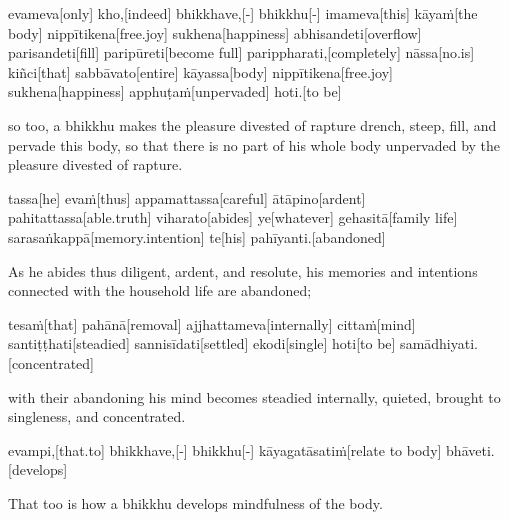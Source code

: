 \begin{samepage}
\begingl[glneveryline={\PaliGlossA,\PaliGlossB}]
evameva[only] kho,[indeed] bhikkhave,[-] bhikkhu[-] imameva[this] kāyaṁ[the body] nippītikena[free.joy] sukhena[happiness] abhisandeti[overflow] parisandeti[fill] paripūreti[become full] parippharati,[completely] nāssa[no.is] kiñci[that] sabbāvato[entire] kāyassa[body] nippītikena[free.joy] sukhena[happiness] apphuṭaṁ[unpervaded] hoti.[to be]
\endgl
\nopagebreak
\linespread{0.5}
\begin{spacin}{0.2}
{\PaliGlossFT so too, a bhikkhu makes the pleasure divested of rapture drench, steep, fill, and pervade this body, so that there is no part of his whole body unpervaded by the pleasure divested of rapture.}
\end{spacin}
\vskip 12pt
\end{samepage}
\begin{samepage}
\begingl[glneveryline={\PaliGlossA,\PaliGlossB}]
tassa[he] evaṁ[thus] appamattassa[careful] ātāpino[ardent] pahitattassa[able.truth] viharato[abides] ye[whatever] gehasitā[family life] sarasaṅkappā[memory.intention] te[his] pahīyanti.[abandoned]
\endgl
\nopagebreak
\linespread{0.5}
\begin{spacin}{0.2}
{\PaliGlossFT As he abides thus diligent, ardent, and resolute, his memories and intentions connected with the household life are abandoned;}
\end{spacin}
\vskip 12pt
\end{samepage}
\begin{samepage}
\begingl[glneveryline={\PaliGlossA,\PaliGlossB}]
tesaṁ[that] pahānā[removal] ajjhattameva[internally] cittaṁ[mind] santiṭṭhati[steadied] sannisīdati[settled] ekodi[single] hoti[to be] samādhiyati.[concentrated]
\endgl
\nopagebreak
\linespread{0.5}
\begin{spacin}{0.2}
{\PaliGlossFT with their abandoning his mind becomes steadied internally, quieted, brought to singleness, and concentrated.}
\end{spacin}
\vskip 12pt
\end{samepage}
\begin{samepage}
\begingl[glneveryline={\PaliGlossA,\PaliGlossB}]
evampi,[that.to] bhikkhave,[-] bhikkhu[-] kāyagatāsatiṁ[relate to body] bhāveti.[develops]
\endgl
\nopagebreak
\linespread{0.5}
\begin{spacin}{0.2}
{\PaliGlossFT That too is how a bhikkhu develops mindfulness of the body.}
\end{spacin}
\vskip 12pt
\end{samepage}
